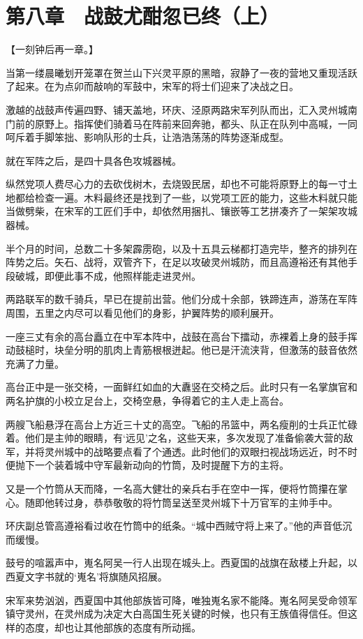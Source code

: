 \section{第八章　战鼓尤酣忽已终（上）}

【一刻钟后再一章。】

当第一缕晨曦划开笼罩在贺兰山下兴灵平原的黑暗，寂静了一夜的营地又重现活跃了起来。在为点卯而敲响的军鼓中，宋军的将士们迎来了决战之日。

激越的战鼓声传遍四野、铺天盖地，环庆、泾原两路宋军列队而出，汇入灵州城南门前的原野上。指挥使们骑着马在阵前来回奔驰，都头、队正在队列中高喊，一同呵斥着手脚笨拙、影响队形的士兵，让浩浩荡荡的阵势逐渐成型。

就在军阵之后，是四十具各色攻城器械。

纵然党项人费尽心力的去砍伐树木，去烧毁民居，却也不可能将原野上的每一寸土地都给检查一遍。木料最终还是找到了一些，以党项工匠的能力，这些木料就只能当做劈柴，在宋军的工匠们手中，却依然用捆扎、镶嵌等工艺拼凑齐了一架架攻城器械。

半个月的时间，总数二十多架霹雳砲，以及十五具云梯都打造完毕，整齐的排列在阵势之后。矢石、战将，双管齐下，在足以攻破灵州城防，而且高遵裕还有其他手段破城，即便此事不成，他照样能走进灵州。

两路联军的数千骑兵，早已在提前出营。他们分成十余部，铁蹄连声，游荡在军阵周围，五里之内尽可以看见他们的身影，护翼阵势的顺利展开。

一座三丈有余的高台矗立在中军本阵中，战鼓在高台下擂动，赤裸着上身的鼓手挥动鼓槌时，块垒分明的肌肉上青筋根根迸起。他已是汗流浃背，但激荡的鼓音依然充满了力量。

高台正中是一张交椅，一面鲜红如血的大纛竖在交椅之后。此时只有一名掌旗官和两名护旗的小校立足台上，交椅空悬，争得着它的主人走上高台。

两艘飞船悬浮在高台上方近三十丈的高空。飞船的吊篮中，两名瘦削的士兵正忙碌着。他们是主帅的眼睛，有‘远见’之名，这些天来，多次发现了准备偷袭大营的敌军，并将灵州城中的战略要点看了个通透。此时他们的双眼扫视战场远近，时不时便抛下一个装着城中守军最新动向的竹筒，及时提醒下方的主将。

又是一个竹筒从天而降，一名高大健壮的亲兵右手在空中一挥，便将竹筒攥在掌心。随即他转过身，恭恭敬敬的将竹筒呈送至灵州城下十万官军的主帅手中。

环庆副总管高遵裕看过收在竹筒中的纸条。“城中西贼守将上来了。”他的声音低沉而缓慢。

鼓号的喧嚣声中，嵬名阿吴一行人出现在城头上。西夏国的战旗在敌楼上升起，以西夏文字书就的‘嵬名’将旗随风招展。

宋军来势汹汹，西夏国中其他部族皆可降，唯独嵬名家不能降。嵬名阿吴受命领军镇守灵州，在灵州成为决定大白高国生死关键的时候，也只有王族值得信任。但这样的态度，却也让其他部族的态度有所动摇。

